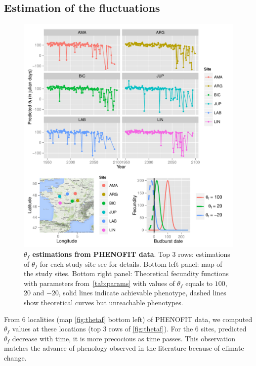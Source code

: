 \subsection*{Estimation of the fluctuations}

\begin{figure}[ht!]
	\centering
	\includegraphics[scale=1]{Figures/optsmaps.pdf}
	\caption{\textbf{$\theta_{f}$ estimations from PHENOFIT data}. Top 3 rows: estimations of $\theta_f$ for each study site see  for details. Bottom left panel: map of the study sites. Bottom right panel: Theoretical fecundity functions with parameters from~\autoref{tab:params} with values of $\theta_f$ equals to $100$, $20$ and $-20$, solid lines indicate achievable phenotype, dashed lines show theoretical curves but unreachable phenotypes.}
	\label{fig:thetaf}
\end{figure}

From 6 localities (map \autoref{fig:thetaf} bottom left) of \textsc{PHENOFIT} data, we computed $\theta_f$ values at these locations (top 3 rows of \autoref{fig:thetaf}). For the 6 sites, predicted $\theta_f$ decrease with time, it is more precocious as time passes. This observation matches the advance of phenology observed in the literature because of climate change.

